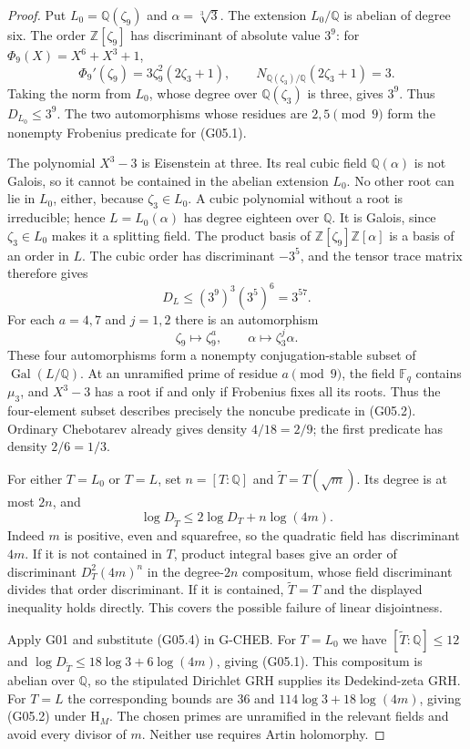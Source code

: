 \begin{proof}
Put $L_0=\mathbb Q(\zeta_9)$ and $\alpha=\sqrt[3]{3}$.  The extension
$L_0/\mathbb Q$ is abelian of degree six.  The order
$\mathbb Z[\zeta_9]$ has discriminant of absolute value $3^9$:
for $\Phi_9(X)=X^6+X^3+1$,
\[
 \Phi_9'(\zeta_9)=3\zeta_9^2(2\zeta_3+1),\qquad
 N_{\mathbb Q(\zeta_3)/\mathbb Q}(2\zeta_3+1)=3.
\]
Taking the norm from $L_0$, whose degree over $\mathbb Q(\zeta_3)$ is
three, gives $3^9$.  Thus $D_{L_0}\le3^9$.  The two automorphisms
whose residues are $2,5\pmod9$ form the nonempty Frobenius predicate
for (G05.1).

The polynomial $X^3-3$ is Eisenstein at three.  Its real cubic field
$\mathbb Q(\alpha)$ is not Galois, so it cannot be contained in the
abelian extension $L_0$.  No other root can lie in $L_0$, either,
because $\zeta_3\in L_0$.  A cubic polynomial without a root is
irreducible; hence $L=L_0(\alpha)$ has degree eighteen over
$\mathbb Q$.  It is Galois, since $\zeta_3\in L_0$ makes it a
splitting field.  The product basis of
$\mathbb Z[\zeta_9]\mathbb Z[\alpha]$ is a basis of an order in $L$.
The cubic order has discriminant $-3^5$, and the tensor trace matrix
therefore gives
\[
 D_L\le (3^9)^3(3^5)^6=3^{57}. \tag{G05.3}
\]
For each $a=4,7$ and $j=1,2$ there is an automorphism
\[
 \zeta_9\longmapsto\zeta_9^a,\qquad
 \alpha\longmapsto\zeta_3^j\alpha.
\]
These four automorphisms form a nonempty conjugation-stable subset
of $\operatorname{Gal}(L/\mathbb Q)$.  At an unramified prime of residue
$a\pmod9$, the field $\mathbb F_q$ contains $\mu_3$, and $X^3-3$
has a root if and only if Frobenius fixes all its roots.  Thus the
four-element subset describes precisely the noncube predicate in
(G05.2).  Ordinary Chebotarev already gives density $4/18=2/9$;
the first predicate has density $2/6=1/3$.

For either $T=L_0$ or $T=L$, set $n=[T:\mathbb Q]$ and
$\widetilde T=T(\sqrt m)$.  Its degree is at most $2n$, and
\[
 \log D_{\widetilde T}\le2\log D_T+n\log(4m). \tag{G05.4}
\]
Indeed $m$ is positive, even and squarefree, so the quadratic field
has discriminant $4m$.  If it is not contained in $T$, product integral
bases give an order of discriminant $D_T^2(4m)^n$ in the degree-$2n$
compositum, whose field discriminant divides that order discriminant.
If it is contained, $\widetilde T=T$ and the displayed inequality
holds directly.  This covers the possible failure of linear disjointness.

Apply G01 and substitute (G05.4) in G-CHEB.  For $T=L_0$ we have
$[\widetilde T:\mathbb Q]\le12$ and
$\log D_{\widetilde T}\le18\log3+6\log(4m)$, giving (G05.1).
This compositum is abelian over $\mathbb Q$, so the stipulated
Dirichlet GRH supplies its Dedekind-zeta GRH.  For $T=L$ the
corresponding bounds are $36$ and $114\log3+18\log(4m)$, giving
(G05.2) under $\mathrm H_M$.  The chosen primes are unramified in
the relevant fields and avoid every divisor of $m$.  Neither use
requires Artin holomorphy.
\end{proof}

